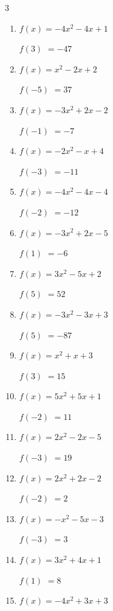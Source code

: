 \begin{multicols}{3}
\begin{enumerate}
$f(5)$
        $= 105$

\columnbreak %

  \item $f(x)=-4x^{2}-4x+1$

$f(3)$
        $= -47$

  \item $f(x)=x^{2}-2x+2$

$f(-5)$
        $= 37$

  \item $f(x)=-3x^{2}+2x-2$

$f(-1)$
        $= -7$

  \item $f(x)=-2x^{2}-x+4$

$f(-3)$
        $= -11$

  \item $f(x)=-4x^{2}-4x-4$

$f(-2)$
        $= -12$

  \item $f(x)=-3x^{2}+2x-5$

$f(1)$
        $= -6$

  \item $f(x)=3x^{2}-5x+2$

$f(5)$
        $= 52$

  \item $f(x)=-3x^{2}-3x+3$

$f(5)$
        $= -87$

  \item $f(x)=x^{2}+x+3$

$f(3)$
        $= 15$

  \item $f(x)=5x^{2}+5x+1$

$f(-2)$
        $= 11$

  \item $f(x)=2x^{2}-2x-5$

$f(-3)$
        $= 19$

  \item $f(x)=2x^{2}+2x-2$

$f(-2)$
        $= 2$

  \item $f(x)=-x^{2}-5x-3$

$f(-3)$
        $= 3$

  \item $f(x)=3x^{2}+4x+1$

$f(1)$
        $= 8$

  \item $f(x)=-4x^{2}+3x+3$


\end{enumerate}
\end{multicols}
